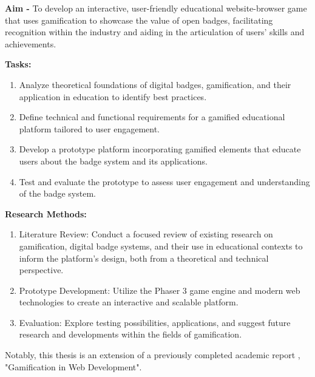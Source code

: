 \textbf{Aim -} To develop an interactive, user-friendly educational website-browser game that uses gamification to showcase the value of open badges, facilitating recognition within the industry and aiding in the articulation of users’ skills and achievements.

\textbf{Tasks:} 
\begin{enumerate}
  \addtolength{\itemsep}{-0.5\baselineskip} 
  \item Analyze theoretical foundations of digital badges, gamification, and their application in education to identify best practices.
  \item Define technical and functional requirements for a gamified educational platform tailored to user engagement.
  \item Develop a prototype platform incorporating gamified elements that educate users about the badge system and its applications.
  \item Test and evaluate the prototype to assess user engagement and understanding of the badge system.
\end{enumerate}

\textbf{Research Methods:}
\begin{enumerate}
  \addtolength{\itemsep}{-0.5\baselineskip} 
  \item Literature Review: Conduct a focused review of existing research on gamification, digital badge systems, and their use in educational contexts to inform the platform's design, both from a theoretical and technical perspective.
  \item Prototype Development: Utilize the Phaser 3 game engine and modern web technologies to create an interactive and scalable platform.
  \item Evaluation: Explore testing possibilities, applications, and suggest future research and developments within the fields of gamification.
\end{enumerate}

Notably, this thesis is an extension of a previously completed academic report \cite{me2024}, "Gamification in Web Development".
\newpage